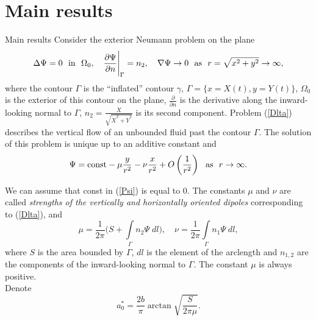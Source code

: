\documentclass{beamer}
\newcommand{\ds}{\displaystyle}
\begin{document}
\section{Main results}
\begin{frame}{Main results}
Consider the exterior Neumann problem on the plane
\begin{equation}\label{Dlta}
\Delta\Psi=0~~{\rm in}~~\Omega_0,\quad \ds\frac{\partial \Psi}{\partial n}\Bigg\vert_{\Gamma}=n_2,\quad \nabla\Psi\to0~~{\rm as}~~r=\sqrt{x^2+y^2}\to\infty,
\end{equation} 
where the contour $\Gamma$ is the ``inflated'' contour $\gamma$, $\Gamma=\big\lbrace x=X(t), y=Y(t)\big\rbrace$, $\Omega_0$ is the exterior of this contour on the plane, $\ds\frac{\partial}{\partial n}$ is the derivative along the inward-looking normal to $\Gamma$, $n_2=\ds\frac{\dot{X}}{\sqrt{\dot{X}^2+\dot{Y}^2}}$ is its second component. Problem (\ref{Dlta}) describes the vertical flow of an unbounded fluid past the contour $\Gamma$. The solution of this problem is unique up to an additive constant  and
\begin{equation}\label{Psi}
\Psi={\rm const}-\mu\ds\frac{y}{r^2}-\nu\ds\frac{x}{r^2}+O\left(\ds\frac{1}{r^2}\right)~~{\rm as}~~r\to\infty.
\end{equation} 

\end{frame}
\begin{frame}
We can assume that const in (\ref{Psi}) is equal to $0$. The constants $\mu$ and $\nu$ are called {\it strengths of the vertically and horizontally oriented  dipoles} corresponding to (\ref{Dlta}), and %
\begin{equation}\label{mu}
\mu=\ds\frac{1}{2\pi}\Bigg(S+\int\limits_{\Gamma} n_2\Psi\;dl\Bigg),\quad\nu=\ds\frac{1}{2\pi}\int\limits_{\Gamma} n_1\Psi\;dl,
\end{equation}
where $S$ is the area bounded by $\Gamma$, $dl$ is the element of the arclength and $n_{1,2}$ are the components of the inward-looking normal to $\Gamma$. The constant $\mu$ is always positive.\\
Denote
\begin{equation}\label{a_0^ast}
a_0^{\ast}=\frac{2b}{\pi}\arctan\sqrt{\ds\frac{S}{2\pi \mu}}.
\end{equation}
\end{frame}
\end{document}
